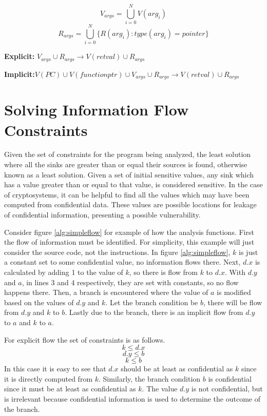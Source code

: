 \[V_{args} = \bigcup_{i=0}^N V(arg_i)\]
\[R_{args} = \bigcup_{i=0}^{N}\{R(arg_i) : type(arg_i) = pointer\}\]

\noindent
\textbf{Explicit:} $V_{args} \cup R_{args} \rightarrow V(retval) \cup R_{args}$

\noindent
\textbf{Implicit:}$V(PC) \cup V(functionptr) \cup V_{args} \cup R_{args} \rightarrow V(retval) \cup R_{args}$

\section{Solving Information Flow Constraints}
Given the set of constraints for the program being analyzed, the least solution
where all the sinks are greater than or equal their sources is found, otherwise
known as a least solution. Given a set of initial sensitive values, any sink
which has a value greater than or equal to that value, is considered sensitive.
In the case of cryptosystems, it can be helpful to find all the values which
may have been computed from confidential data. These values are possible
locations for leakage of confidential information, presenting a possible
vulnerability.


Consider figure \ref{alg:simpleflow} for example of how the analysis functions.
First the flow of information must be identified. For simplicity, this example
will just consider the source code, not the instructions. In figure
\ref{alg:simpleflow}, $k$ is just a constant set to some confidential value, no
information flows there. Next, $d.x$ is calculated by adding 1 to the value of
$k$, so there is flow from $k$ to $d.x$. With $d.y$ and $a$, in lines 3 and 4
respectively, they are set with constants, so no flow happens there. Then, a
branch is encountered where the value of $a$ is modified based on the values of
$d.y$ and $k$. Let the branch condition be $b$, there will be flow from $d.y$
and $k$ to $b$. Lastly due to the branch, there is an implicit flow from $d.y$
to $a$ and $k$ to $a$.

For explicit flow the set of constraints is as follows.
\[
  k \leq d.x
\]
\[
  d.y \leq b
\]
\[
  k \leq b
\]
In this case it is easy to see that $d.x$ should be at least as confidential as $k$
since it is directly computed from $k$. Similarly, the branch condition $b$ is
confidential since it must be at least as confidential as $k$. The value $d.y$
is not confidential, but is irrelevant because confidential information is used
to determine the outcome of the branch. 

